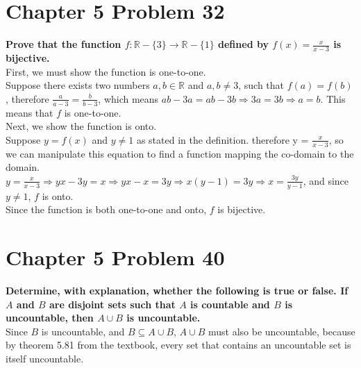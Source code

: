 \documentclass[10pt]{article}
\begin{document}
\section{Chapter 5 Problem 32}
\textbf{Prove that the function $f: \mathbb{R} - \{3\} \to \mathbb{R} - \{1\}$ defined by $f(x) = \frac{x}{x-3}$ is bijective.} \\

First, we must show the function is one-to-one. \\
Suppose there exists two numbers $a,b \in \mathbb{R}$ and $a,b \not= 3$, such that $f(a) = f(b)$, therefore $\frac{a}{a-3} = \frac{b}{b-3}$, which means
$ab - 3a = ab - 3b \Rightarrow 3a = 3b \Rightarrow a = b$.  This means that $f$ is one-to-one. \\

Next, we show the function is onto. \\
Suppose $y = f(x)$ and $y \not= 1$ as stated in the definition.  therefore y = $\frac{x}{x-3}$, so we can manipulate this equation to find a function mapping the
co-domain to the domain. \\
$y = \frac{x}{x-3} \Rightarrow yx - 3y = x \Rightarrow yx - x = 3y \Rightarrow x(y - 1) = 3y \Rightarrow x = \frac{3y}{y-1}$, and since $y \not= 1$, $f$ is onto. \\

Since the function is both one-to-one and onto, $f$ is bijective.


\section{Chapter 5 Problem 40}
\textbf{Determine, with explanation, whether the following is true or false.  If $A$ and $B$ are disjoint sets such that $A$ is countable
and $B$ is uncountable, then $A \cup B$ is uncountable.} \\

Since $B$ is uncountable, and $B \subseteq A \cup B$, $A \cup B$ must also be uncountable, because by theorem 5.81 from the textbook, every set that contains an
uncountable set is itself uncountable.
\end{document}
